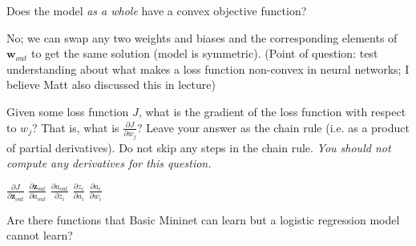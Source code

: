 \begin{parts}
\begin{subparts}
        \subpart[2]
            Does the model \textit{as a whole} have a convex objective function?
            
            \begin{tcolorbox}[fit,height=3cm, width=15cm, blank, borderline={1pt}{-2pt}]
            \end{tcolorbox}
            \begin{soln}
                No; we can swap any two weights and biases and the corresponding elements of $\mathbf{w}_{out}$ to get the same solution (model is symmetric). (Point of question: test understanding about what makes a loss function non-convex in neural networks; I believe Matt also discussed this in lecture)
            \end{soln}


        \subpart[2]
            Given some loss function $J$, what is the gradient of the loss function with respect to $w_j$? That is, what is $\frac{\partial J}{\partial w_j}$? Leave your answer as the chain rule (i.e. as a product of partial derivatives). Do not skip any steps in the chain rule. \textit{You should not compute any derivatives for this question.}
            
            \begin{tcolorbox}[fit,height=3cm, width=15cm, blank, borderline={1pt}{-2pt}]
            \end{tcolorbox}
            \begin{soln}
                $\frac{\partial J}{\partial \mathbf{z}_{out}}$
                $\frac{\partial \mathbf{z}_{out}}{\partial a_{out}}$
                $\frac{\partial a_{out}}{\partial z_i}$
                $\frac{\partial z_i}{\partial a_i}$
                $\frac{\partial a_i}{\partial w_i}$
            \end{soln}

        \subpart[2]
            Are there functions that Basic Mininet can learn but a logistic regression model cannot learn?
            

\end{subparts}
\end{parts}
